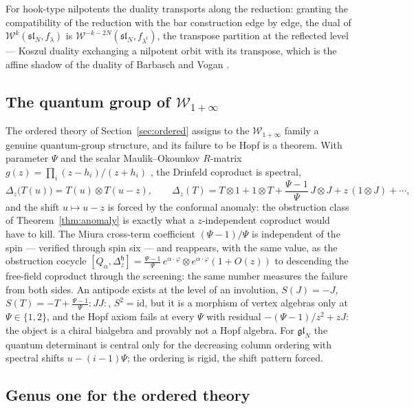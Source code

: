 \documentclass[11pt]{amsart}
\numberwithin{equation}{section}
\theoremstyle{plain}
\theoremstyle{definition}
\theoremstyle{remark}
\newcommand{\cW}{\mathcal{W}}
\begin{document}
For hook-type nilpotents the duality transports along the reduction:
granting the compatibility of the reduction with the bar construction
edge by edge, the dual of $\cW^{k}(\mathfrak{sl}_N,f_{\lambda})$ is
$\cW^{-k-2N}(\mathfrak{sl}_N,f_{\lambda^{t}})$, the transpose
partition at the reflected level --- Koszul duality exchanging a
nilpotent orbit with its transpose, which is the affine shadow of the
duality of Barbasch and Vogan \cite{BV}.

\subsection{The quantum group of $\cW_{1+\infty}$}

The ordered theory of Section~\ref{sec:ordered} assigns to the
$\cW_{1+\infty}$ family a genuine quantum-group structure, and its
failure to be Hopf is a theorem. With parameter $\Psi$ and the scalar
Maulik--Okounkov $R$-matrix
$g(z)=\prod_i(z-h_i)/(z+h_i)$ \cite{MO}, the Drinfeld coproduct is
spectral,
\begin{equation}
\Delta_z\bigl(T(u)\bigr)=T(u)\otimes T(u-z),
\qquad
\Delta_z(T)=T\otimes1+1\otimes T
+\frac{\Psi-1}{\Psi}\,J\otimes J+z\,(1\otimes J)+\cdots,
\end{equation}
and the shift $u\mapsto u-z$ is forced by the conformal anomaly: the
obstruction class of Theorem~\ref{thm:anomaly} is exactly what a
$z$-independent coproduct would have to kill. The Miura cross-term
coefficient $(\Psi-1)/\Psi$ is independent of the spin --- verified
through spin six --- and reappears, with the same value, as the
obstruction cocycle
$[Q_{\alpha},\Delta_z^{\mathfrak{h}}]
=\tfrac{\Psi-1}{\Psi}\,e^{\alpha\cdot\varphi}\otimes
e^{\alpha\cdot\varphi}(1+O(z))$
to descending the free-field coproduct through the screening: the same
number measures the failure from both sides. An antipode exists at the
level of an involution, $S(J)=-J$,
$S(T)=-T+\tfrac{\Psi-1}{\Psi}:\!JJ\!:$, $S^{2}=\mathrm{id}$, but it is
a morphism of vertex algebras only at $\Psi\in\{1,2\}$, and the Hopf
axiom fails at every $\Psi$ with residual $-(\Psi-1)/z^{2}+zJ$: the
object is a chiral bialgebra and provably not a Hopf algebra. For
$\mathfrak{gl}_N$ the quantum determinant is central only for the
decreasing column ordering with spectral shifts $u-(i-1)\Psi$; the
ordering is rigid, the shift pattern forced.

\subsection{Genus one for the ordered theory}
\end{document}
